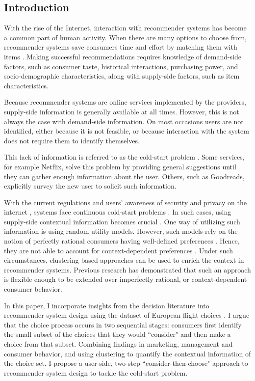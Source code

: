 \documentclass[a4paper,12pt]{article}
\begin{document}
\subsection{Introduction}

With the rise of the Internet, interaction with recommender systems has become a common part of human activity. When there are many options to choose from, recommender systems save consumers time and effort by matching them with items \citep{bobadilla2013recommender}. Making successful recommendations requires knowledge of demand-side factors, such as consumer taste, historical interactions, purchasing power, and socio-demographic characteristics, along with supply-side factors, such as item characteristics.

Because recommender systems are online services implemented by the providers, supply-side information is generally available at all times. However, this is not always the case with demand-side information. On most occasions users are not identified, either because it is not feasible, or because interaction with the system does not require them to identify themselves.

This lack of information is referred to as the cold-start problem \citep{adomavicius2005toward}. Some services, for example Netflix, solve this problem by providing general suggestions until they can gather enough information about the user. Others, such as Goodreads, explicitly survey the new user to solicit such information.

With the current regulations and users' awareness of security and privacy on the internet \citep{anton2010internet}, systems face continuous cold-start problems \citep{wong2014online}. In such cases, using supply-side contextual information becomes crucial \citep{adomavicius2005toward}. One way of utilizing such information is using random utility models. However, such models rely on the notion of perfectly rational consumers having well-defined preferences \citep{babutsidze2019asymmetric}. Hence, they are not able to account for context-dependent preferences \citep{tversky1979preference}. Under such circumstances, clustering-based approaches can be used to enrich the context in recommender systems. Previous research \citep{babutsidze2019asymmetric} has demonstrated that such an approach is flexible enough to be extended over imperfectly rational, or context-dependent consumer behavior.

In this paper, I incorporate insights from the decision literature into recommender system design using the dataset of European flight choices \citep{lheritier2019airline}. I argue that the choice process occurs in two sequential stages: consumers first identify the small subset of the choices that they would ``consider" and then make a choice from that subset. Combining findings in marketing, management and consumer behavior, and using clustering to quantify the contextual information of the choice set,  I propose a user-side, two-step  ``consider-then-choose" \citep{liu2011efficient, gilbride2004choice} approach to recommender system design to tackle the cold-start problem. 
\end{document}

